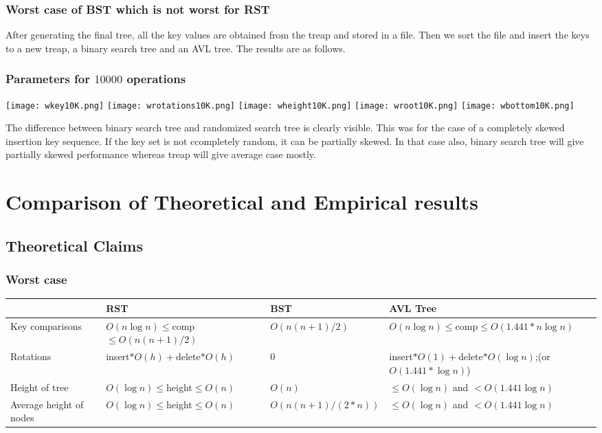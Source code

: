\documentclass{article}
\begin{document}
\subsubsection{Worst case of BST which is not worst for RST}
After generating the final tree, all the key values are obtained from the treap and stored in a file. Then we sort the file and insert the keys to a new treap, a binary search tree and an AVL tree. The results are as follows.
\subsubsection{Parameters for $10000$ operations}
\begin{center}
\texttt{[image: wkey10K.png]}
\texttt{[image: wrotations10K.png]}
\texttt{[image: wheight10K.png]}
\texttt{[image: wroot10K.png]}
\texttt{[image: wbottom10K.png]}
\end{center}
The difference between binary search tree and randomized search tree is clearly visible. This was for the case of a completely skewed insertion key sequence. If the key set is not ccompletely random, it can be partially skewed. In that case also, binary search tree will give partially skewed performance whereas treap will give average case mostly.


\section{Comparison of Theoretical and Empirical results}
\subsection{Theoretical Claims}
\subsubsection{Worst case}
\begin{center}
\begin{tabular}{||p{4cm}||p{4cm}|p{3cm}|p{5cm}||}
\hline
& RST & BST & AVL Tree \\
\hline\hline
Key comparisons & $O(n\log n)\le$comp$\le O(n(n+1)/2)$ & $O(n(n+1)/2)$ & $O(n\log n)\le$comp$\le O(1.441*n\log n)$ \\ 
\hline
Rotations & insert$*O(h)+$delete$*O(h)$ & 0 & insert$*O(1)+$delete$*O(\log n)$;(or $O(1.441*\log n)$) \\
\hline
Height of tree & $O(\log n)\le$height$\le O(n)$ & $O(n)$ & $\le O(\log n)$ and $<O(1.441\log n)$ \\
\hline
Average height of nodes & $O(\log n)\le$height$\le O(n)$ & $O(n(n+1)/(2*n))$ & $\le O(\log n)$ and $<O(1.441\log n)$ \\
\hline
\end{tabular}
\end{center}
\end{document}

